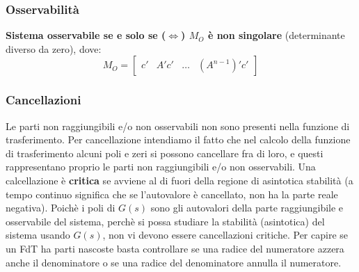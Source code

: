\begin{landscape}
    \subsubsection*{Osservabilità}
    \textbf{Sistema osservabile se e solo se ($\Leftrightarrow$) $M_O$ è non singolare} (determinante diverso da zero), dove:
    \[
        M_O = \left[\begin{matrix}
            c' & A'c' & \dots & (A^{n-1})' c'
        \end{matrix}\right]
    \]
    \subsubsection*{Cancellazioni}
    Le parti non raggiungibili e/o non osservabili non sono presenti nella funzione di trasferimento.\newline
    Per cancellazione intendiamo il fatto che nel calcolo della funzione di trasferimento alcuni poli
    e zeri si possono cancellare fra di loro, e questi rappresentano proprio le parti non raggiungibili
    e/o non osservabili.\newline
    \newline
    Una calcellazione è \textbf{critica} se avviene al di fuori della regione di asintotica stabilità (a tempo continuo significa che se l'autovalore è cancellato, non ha la parte reale negativa).\newline
    Poichè i poli di $G(s)$ sono gli autovalori della parte raggiungibile e osservabile del sistema, perchè si possa studiare la stabilità (asintotica) del sistema usando $G(s)$, non vi devono essere cancellazioni critiche.
    \newline
    \newline
    Per capire se un FdT ha parti nascoste basta controllare se una radice del numeratore azzera anche il denominatore o se una radice del denominatore annulla il numeratore. 

\end{landscape}
